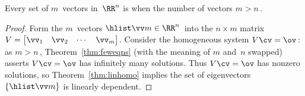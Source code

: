 \begin{theorem} \label{thm:mgtnli} 
Every  set of \(m\)~vectors in~\(\RR^n\) is  when the number of vectors \(m>n\)\,.
\end{theorem}
\begin{proof} 
Form the \(m\)~vectors \(\hlist\vv m\in\RR^n\)\ into the \(n\times m\) matrix \(V=\begin{bmatrix} \vv_1&\vv_2&\cdots&\vv_m \end{bmatrix}\).
Consider the homogeneous system \(V\cv=\ov\)\,: 
as \(m>n\)\,, Theorem~\ref{thm:feweqns} (with the meaning of \(m\) and~\(n\) swapped) asserts \(V\cv=\ov\) has infinitely many solutions.
Thus \(V\cv=\ov\) has nonzero solutions, so Theorem~\ref{thm:linhomo} implies the set of eigenvectors \(\{\hlist\vv m\}\) is linearly dependent.
\end{proof}



